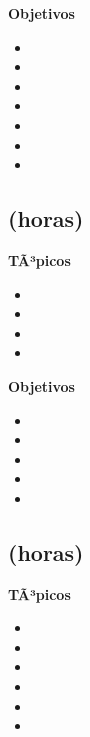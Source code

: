 \textbf{Objetivos}
\begin{itemize}
	\item \ALTRESObjUNO
	\item \ALTRESObjDOS
	\item \ALTRESObjTRES
	\item \ALTRESObjCUATRO
	\item \ALTRESObjCINCO
	\item \ALTRESObjSEIS
	\item \ALTRESObjSIETE
\end{itemize}

\subsection{\ALCUATRODef  (\ALCUATROHours horas)}\label{sec:BOK-AL4}

\textbf{TÃ³picos}
\begin{itemize}
	\item \ALCUATROTopicConsenso
	\item \ALCUATROTopicDeteccion
	\item \ALCUATROTopicTolerancia
	\item \ALCUATROTopicEstabilizacion
\end{itemize}

\textbf{Objetivos}
\begin{itemize}
	\item \ALCUATROObjUNO
	\item \ALCUATROObjDOS
	\item \ALCUATROObjTRES
	\item \ALCUATROObjCUATRO
	\item \ALCUATROObjCINCO
\end{itemize}

\subsection{\ALCINCODef  (\ALCINCOHours horas)}\label{sec:BOK-AL5}

\textbf{TÃ³picos}
\begin{itemize}
	\item \ALCINCOTopicMaquinas
	\item \ALCINCOTopicGramaticas
	\item \ALCINCOTopicProblemas
	\item \ALCINCOTopicFunciones
	\item \ALCINCOTopicEl
	\item \ALCINCOTopicImplicaciones
\end{itemize}

